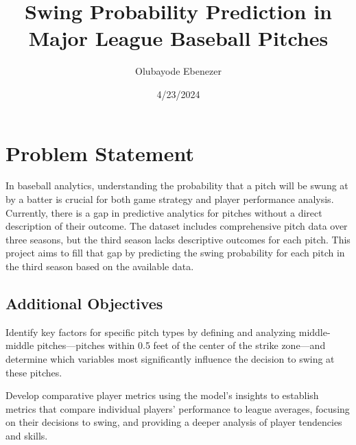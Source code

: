 \documentclass{article}
\title{Swing Probability Prediction in Major League Baseball Pitches}
\author{Olubayode Ebenezer}
\date{4/23/2024}
\begin{document}
\maketitle

\section*{Problem Statement}
In baseball analytics, understanding the probability that a pitch will be swung at by a batter is crucial for both game strategy and player performance analysis. Currently, there is a gap in predictive analytics for pitches without a direct description of their outcome. The dataset includes comprehensive pitch data over three seasons, but the third season lacks descriptive outcomes for each pitch. This project aims to fill that gap by predicting the swing probability for each pitch in the third season based on the available data.

\subsection*{Additional Objectives}
Identify key factors for specific pitch types by defining and analyzing middle-middle pitches—pitches within 0.5 feet of the center of the strike zone—and determine which variables most significantly influence the decision to swing at these pitches.

Develop comparative player metrics using the model's insights to establish metrics that compare individual players’ performance to league averages, focusing on their decisions to swing, and providing a deeper analysis of player tendencies and skills.
\end{document}
